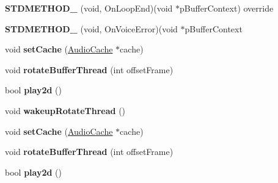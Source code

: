\begin{DoxyCompactItemize}
\item 
\mbox{\label{classexperimental_1_1AudioPlayer_a9a2fc1f724f5bf4628eb24e979c991f2}} 
{\bfseries S\+T\+D\+M\+E\+T\+H\+O\+D\+\_\+} (void, On\+Loop\+End)(void $\ast$p\+Buffer\+Context) override
\item 
\mbox{\label{classexperimental_1_1AudioPlayer_a37ef819842877ab4dea86e1b011583f7}} 
{\bfseries S\+T\+D\+M\+E\+T\+H\+O\+D\+\_\+} (void, On\+Voice\+Error)(void $\ast$p\+Buffer\+Context
\item 
\mbox{\label{classexperimental_1_1AudioPlayer_ac3f62b52b461ce6819f585abda7450a0}} 
void {\bfseries set\+Cache} (\hyperlink{classexperimental_1_1AudioCache}{Audio\+Cache} $\ast$cache)
\item 
\mbox{\label{classexperimental_1_1AudioPlayer_ae40443667d89341e376fa5241fd54bc4}} 
void {\bfseries rotate\+Buffer\+Thread} (int offset\+Frame)
\item 
\mbox{\label{classexperimental_1_1AudioPlayer_a1a99b6133772ee88475daf70b24d9ed2}} 
bool {\bfseries play2d} ()
\item 
\mbox{\label{classexperimental_1_1AudioPlayer_abc9a6a80f6d696fa8622fe0ed7bf0663}} 
void {\bfseries wakeup\+Rotate\+Thread} ()
\item 
\mbox{\label{classexperimental_1_1AudioPlayer_a94b30ea4330233a37aeba6a91c0d8df1}} 
void {\bfseries set\+Cache} (\hyperlink{classexperimental_1_1AudioCache}{Audio\+Cache} $\ast$cache)
\item 
\mbox{\label{classexperimental_1_1AudioPlayer_a5f09f20a88680beb42b14b0d982e8e70}} 
void {\bfseries rotate\+Buffer\+Thread} (int offset\+Frame)
\item 
\mbox{\label{classexperimental_1_1AudioPlayer_a69e4780de70ef78a396cc0031a94dd96}} 
bool {\bfseries play2d} ()
\item 
\mbox{\label{classexperimental_1_1AudioPlayer_a801928ba8e7a8353a9c6e0c2e6085603}} 

\end{DoxyCompactItemize}
